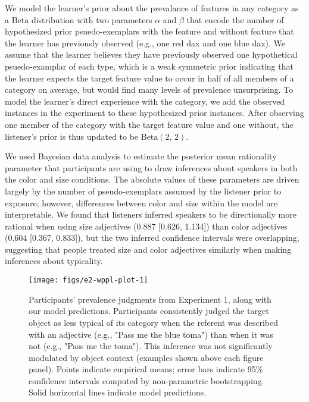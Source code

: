 \documentclass{ucetd}
\begin{document}
We model the learner's prior about the prevalance of features in any
category as a \(\text{Beta}\) distribution with two parameters
\(\alpha\) and \(\beta\) that encode the number of hypothesized prior
psuedo-exemplars with the feature and without feature that the learner
has previously observed (e.g., one red dax and one blue dax). We assume
that the learner believes they have previously observed one hypothetical
psuedo-examplar of each type, which is a weak symmetric prior indicating
that the learner expects the target feature value to occur in half of
all members of a category on average, but would find many levels of
prevalence unsurprising. To model the learner's direct experience with
the category, we add the observed instances in the experiment to these
hypothesized prior instances. After observing one member of the category
with the target feature value and one without, the listener's prior is
thus updated to be \(\text{Beta}\left(2,\,2\right)\).

We used Bayesian data analysis to estimate the posterior mean
rationality parameter that participants are using to draw inferences
about speakers in both the color and size conditions. The absolute
values of these parameters are driven largely by the number of
pseudo-exemplars assumed by the listener prior to exposure; however,
differences between color and size within the model are interpretable.
We found that listeners inferred speakers to be directionally more
rational when using size adjectives (0.887 {[}0.626, 1.134{]}) than
color adjectives (0.604 {[}0.367, 0.833{]}), but the two inferred
confidence intervals were overlapping, suggesting that people treated
size and color adjectives similarly when making inferences about
typicality.

\begin{figure}[!tb]

{\centering \texttt{[image: figs/e2-wppl-plot-1]} 

}

\caption{Participants' prevalence judgments from Experiment 1, along with our model predictions. Participants consistently judged the target object as less typical of its category when the referent was described with an adjective (e.g., "Pass me the blue toma") than when it was not (e.g., "Pass me the toma"). This inference was not significantly modulated by object context (examples shown above each figure panel). Points indicate empirical means; error bars indicate 95\% confidence intervals computed by non-parametric bootstrapping. Solid horizontal lines indicate model predictions.}\label{fig:e2-wppl-plot}
\end{figure}
\end{document}
